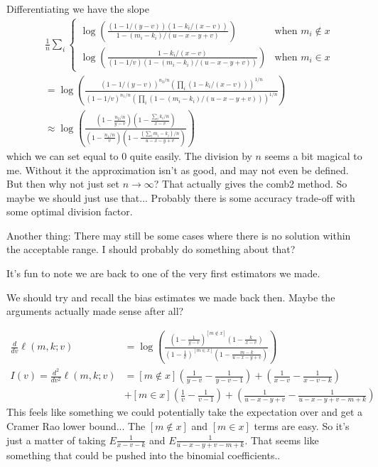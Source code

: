Differentiating we have the slope
\begin{align}
   &\frac{1}{n}\sum_i \begin{cases}
      \log\left(\frac{(1-1/(y-v))(1-k_i/(x-v))}{1-(m_i-k_i)/(u-x-y+v)}\right)
      &\text{when $m_i\not\in x$}
      \\
   \log\left(\frac{1-k_i/(x-v)}{(1-1/v)(1-(m_i-k_i)/(u-x-y+v))}\right)
      &\text{when $m_i\in x$}
   \end{cases}
   \\&=
      \log\left(\frac{
         (1-1/(y-v))^{n_2/n}
         (\prod_i(1-k_i/(x-v)))^{1/n}
      }{
         (1-1/v)^{n_1/n}
         (\prod_i (1-(m_i-k_i)/(u-x-y+v)))^{1/n}
      }\right)
   \\&\approx
      \log\left(\frac{
            (1-\frac{n_2/n}{y-v})
            (1-\frac{\sum_i k_i/n}{x-v})
      }{
         (1-\frac{n_1/n}{v})
         (1-\frac{(\sum_i m_i-k_i)/n}{u-x-y+v})
      }\right)
\end{align}
which we can set equal to 0 quite easily.
The division by $n$ seems a bit magical to me.
Without it the approximation isn't as good, and may not even be defined.
But then why not just set $n\to\infty$?
That actually gives the comb2 method.
So maybe we should just use that...
Probably there is some accuracy trade-off with some optimal division factor.

Another thing: There may still be some cases where there is no solution within the acceptable range.
I should probably do something about that?


It's fun to note we are back to one of the very first estimators we made.

We should try and recall the bias estimates we made back then.
Maybe the arguments actually made sense after all?


\begin{align}
   \frac{d}{dv}\ell(m,k;v)&=
   \log\left(\frac{(1-\frac1{y-v})^{[m\not\in x]}(1-\frac{k}{x-v})}{(1-\frac 1v)^{[m\in x]}(1-\frac{m-k}{u-x-y+v})}\right)
   \\
   I(v) = \frac{d^2}{dv^2}\ell(m,k;v)&=
    [m\not\in x](\frac1{y-v}-\frac1{y-v-1})
   + (\frac1{x-v}-\frac1{x-v-k})
                            \\&
   +[m\in x](\frac1v-\frac1{v-1})
   + (\frac1{u-x-y+v}-\frac1{u-x-y+v-m+k})
\end{align}
This feels like something we could potentially take the expectation over and get a Cramer Rao lower bound...
The $[m\not\in x]$ and $[m\in x]$ terms are easy.
So it's just a matter of taking
$E\frac1{x-v-k}$ and $E\frac1{u-x-y+v-m+k}$.
That seems like something that could be pushed into the binomial coefficients..

